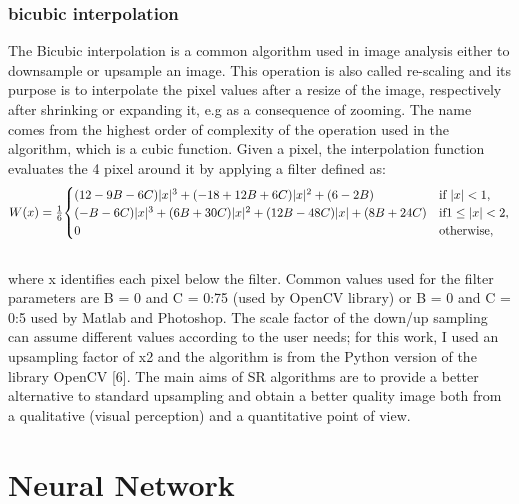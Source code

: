 \documentclass[a4paper, 10pt]{book}
\begin{document}
\subsection{bicubic interpolation}

The Bicubic interpolation is a common algorithm used in image analysis either to downsample or upsample an image. This operation is also called re-scaling and its purpose is to interpolate the pixel values after a resize of the image, respectively after shrinking or expanding it, e.g as a consequence of zooming. The name comes from the highest order of complexity of the operation used in the algorithm, which is a cubic function. Given
a pixel, the interpolation function evaluates the 4 pixel around it by applying a filter defined as:
\begin{equation}
    \label{eqn:bicubic}
{\displaystyle W(x)={\tfrac {1}{6}}{\begin{cases}(12-9B-6C)|x|^{3}+(-18+12B+6C)|x|^{2}+(6-2B)&{\text{if }}$$|x|< 1$$,\\(-B-6C)|x|^{3}+(6B+30C)|x|^{2}+(12B-48C)|x|+(8B+24C) &{\text{if}}1\leq|x|<2,\\0&{\text{otherwise}},\end{cases}}}
\end{equation}
\\
where x identifies each pixel below the filter. Common values used for the filter parameters are B = 0 and C = 0:75 (used by OpenCV library) or B = 0 and C = 0:5 used by Matlab and Photoshop. The scale factor of the down/up sampling can assume different values according to the user needs; for this work, I used an upsampling factor of x2 and the algorithm is from the Python version of the library OpenCV [6]. The
main aims of SR algorithms are to provide a better alternative to standard upsampling and obtain a better quality image both from a qualitative (visual perception) and a quantitative point of view.


\chapter{Neural Network}
\end{document}
